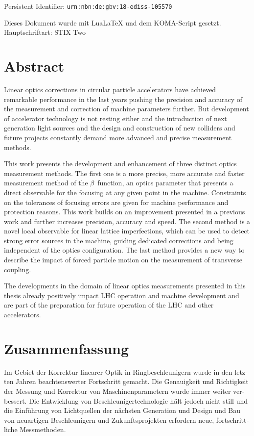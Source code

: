 \vfill
\renewcommand\baselinestretch{\textlinespread}\selectfont
\begin{center}
    Persistent Identifier: \texttt{urn:nbn:de:gbv:18-ediss-105570}
\end{center}
\noindent Dieses Dokument wurde mit LuaLaTeX und dem KOMA-Script gesetzt.\\
Hauptschriftart: STIX Two

\chapter*{Abstract}

Linear optics corrections in circular particle accelerators have achieved remarkable performance in the last years %
pushing the precision and accuracy of the measurement and correction of machine parameters further.
But development of accelerator technology is not resting either and the introduction of
next generation light sources and the design and construction of new colliders and future projects
constantly demand more advanced and precise measurement methods.

This work presents the development and enhancement of three distinct optics measurement methods.
The first one is a more precise, more accurate and faster measurement method of the $\beta$~function,
an optics parameter that presents a direct observable for the focusing at any given point in the machine.
Constraints on the tolerances of focusing errors are given for machine performance and protection reasons.
This work builds on an improvement presented in a previous work and further increases precision, accuracy and speed.
The second method is a novel local observable for linear lattice imperfections, which can be used to detect
strong error sources in the machine, guiding dedicated corrections and being independent of the optics configuration.
The last method provides a new way to describe the impact of forced particle motion on the measurement of transverse coupling.

The developments in the domain of linear optics measurements presented in this thesis
already positively impact LHC operation and machine development and are part of the preparation for
future operation of the LHC and other accelerators.


\chapter*{Zusammenfassung}
\foreignlanguage{ngerman}{
Im Gebiet der Korrektur linearer Optik in Ringbeschleunigern wurde in den letzten Jahren beachtenswerter Fortschritt gemacht.
Die Genauigkeit und Richtigkeit der Messung und Korrektur von Maschinenparametern wurde immer weiter verbessert.
Die Entwicklung von Beschleunigertechnologie hält jedoch nicht still und die Einführung von Lichtquellen der nächsten Generation
und Design und Bau von neuartigen Beschleunigern und Zukunftsprojekten erfordern neue, fortschrittliche Messmethoden.
}

